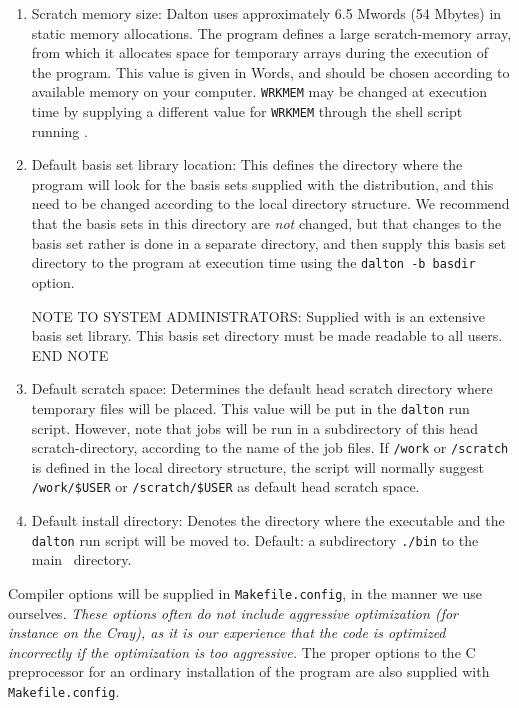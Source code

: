 \begin{enumerate}
\item Scratch memory
size: Dalton uses approximately 6.5 Mwords (54 Mbytes)
in static memory allocations. The program defines a large scratch-memory
array, from which it allocates space for temporary arrays
during the execution of the program. This value is given in Words, and
should be chosen according to available memory on your computer.
\verb|WRKMEM| may be changed at execution time by supplying a
different value for \verb|WRKMEM| through the shell script running
{\dalton}.

\item Default basis set library
location: This defines the directory where the program will look for the
basis sets supplied with the distribution, and this need to be
changed according to the local directory structure. We recommend
that the basis sets in this directory are {\em not} changed, but
that changes to the basis set rather is done in a separate
directory, and then supply this basis set directory to the program
at execution time using the \verb|dalton -b basdir| option.

{\sc NOTE TO SYSTEM ADMINISTRATORS:} Supplied with {\dalton} is an
extensive basis set library. This basis set directory must be made
readable to all users. {\sc END NOTE}

\item Default scratch
space:
Determines the default head scratch
directory where temporary files will be placed. This value will be put
in the \verb|dalton| run script. However, note that jobs will be run in
a subdirectory of this head scratch-directory, according to the name
of the job files. If \verb|/work| or \verb|/scratch| is defined in the
local directory structure, the script will normally suggest
\verb|/work/$USER| or  \verb|/scratch/$USER| as default head scratch space.

\item Default install 
directory:
Denotes the directory where the {\dalton} executable and the
\verb|dalton| run script will be moved to.
Default: a subdirectory {\tt ./bin} to the main \dalton\ directory.
\end{enumerate}

Compiler options will be supplied in \verb|Makefile.config|, in the manner
we use ourselves. {\em These options often do not include aggressive
optimization (for instance on the Cray), as
it is our experience that
the code is optimized incorrectly if the optimization is too
aggressive.} The proper options to the C preprocessor for an ordinary
installation of the program are also supplied with
\verb|Makefile.config|.

